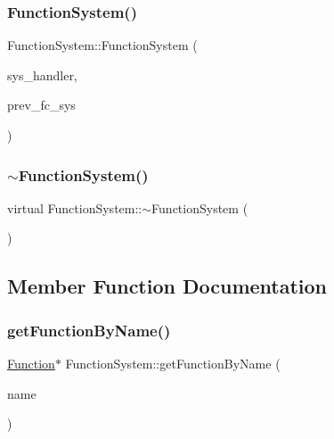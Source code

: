 \subsubsection{\texorpdfstring{Function\+System()}{FunctionSystem()}\hspace{0.1cm}{\footnotesize\ttfamily [3/3]}}
{\footnotesize\ttfamily Function\+System\+::\+Function\+System (\begin{DoxyParamCaption}\item[{\hyperlink{classSystemHandler}{System\+Handler} $\ast$}]{sys\+\_\+handler,  }\item[{\hyperlink{classFunctionSystem}{Function\+System} $\ast$}]{prev\+\_\+fc\+\_\+sys }\end{DoxyParamCaption})}

\mbox{\label{classFunctionSystem_ad6f794406996091d08df65e8d3e0e665}} 
\subsubsection{\texorpdfstring{$\sim$\+Function\+System()}{~FunctionSystem()}}
{\footnotesize\ttfamily virtual Function\+System\+::$\sim$\+Function\+System (\begin{DoxyParamCaption}{ }\end{DoxyParamCaption})\hspace{0.3cm}{\ttfamily [virtual]}}



\subsection{Member Function Documentation}
\mbox{\label{classFunctionSystem_a6ccd76d0760272b64790d6f5c8cdc607}} 
\subsubsection{\texorpdfstring{get\+Function\+By\+Name()}{getFunctionByName()}}
{\footnotesize\ttfamily \hyperlink{classFunction}{Function}$\ast$ Function\+System\+::get\+Function\+By\+Name (\begin{DoxyParamCaption}\item[{std\+::string}]{name }\end{DoxyParamCaption})}

